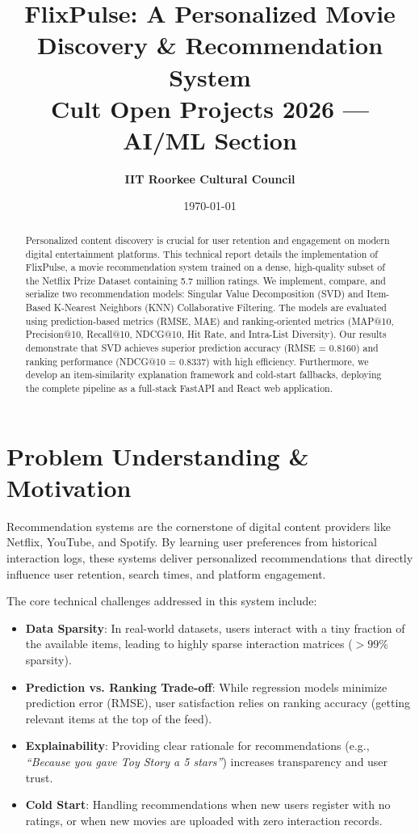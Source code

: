 \documentclass[11pt,a4paper]{article}
\title{\textbf{FlixPulse: A Personalized Movie Discovery \& Recommendation System}\\
\large{Cult Open Projects 2026 --- AI/ML Section}}
\author{\textbf{IIT Roorkee Cultural Council}}
\date{\today}
\begin{document}
\maketitle

\begin{abstract}
Personalized content discovery is crucial for user retention and engagement on modern digital entertainment platforms. This technical report details the implementation of FlixPulse, a movie recommendation system trained on a dense, high-quality subset of the Netflix Prize Dataset containing 5.7 million ratings. We implement, compare, and serialize two recommendation models: Singular Value Decomposition (SVD) and Item-Based K-Nearest Neighbors (KNN) Collaborative Filtering. The models are evaluated using prediction-based metrics (RMSE, MAE) and ranking-oriented metrics (MAP@10, Precision@10, Recall@10, NDCG@10, Hit Rate, and Intra-List Diversity). Our results demonstrate that SVD achieves superior prediction accuracy (RMSE = 0.8160) and ranking performance (NDCG@10 = 0.8337) with high efficiency. Furthermore, we develop an item-similarity explanation framework and cold-start fallbacks, deploying the complete pipeline as a full-stack FastAPI and React web application.
\end{abstract}

\newpage

\section{Problem Understanding \& Motivation}
Recommendation systems are the cornerstone of digital content providers like Netflix, YouTube, and Spotify. By learning user preferences from historical interaction logs, these systems deliver personalized recommendations that directly influence user retention, search times, and platform engagement.

The core technical challenges addressed in this system include:
\begin{itemize}
    \item \textbf{Data Sparsity}: In real-world datasets, users interact with a tiny fraction of the available items, leading to highly sparse interaction matrices ($>99\%$ sparsity).
    \item \textbf{Prediction vs. Ranking Trade-off}: While regression models minimize prediction error (RMSE), user satisfaction relies on ranking accuracy (getting relevant items at the top of the feed).
    \item \textbf{Explainability}: Providing clear rationale for recommendations (e.g., \textit{``Because you gave Toy Story a 5 stars''}) increases transparency and user trust.
    \item \textbf{Cold Start}: Handling recommendations when new users register with no ratings, or when new movies are uploaded with zero interaction records.
\end{itemize}
\end{document}
